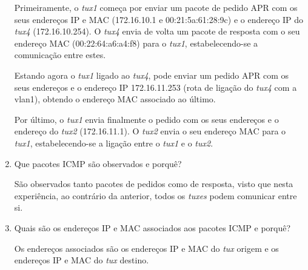 \documentclass{article}
\begin{document}
\begin{enumerate}
Primeiramente, o \textit{tux1} começa por enviar um pacote de pedido APR com os seus endereços IP e MAC (172.16.10.1 e 00:21:5a:61:28:9c) e o endereço IP do \textit{tux4} (172.16.10.254). O \textit{tux4} envia de volta um pacote de resposta com o seu endereço MAC (00:22:64:a6:a4:f8) para o \textit{tux1}, estabelecendo-se a comunicação entre estes.

Estando agora o \textit{tux1} ligado ao \textit{tux4}, pode enviar um pedido APR com os seus endereços e o endereço IP  172.16.11.253 (rota de ligação do \textit{tux4} com a vlan1), obtendo o endereço MAC associado ao último.

Por último, o \textit{tux1} envia finalmente o pedido com os seus endereços e o endereço do \textit{tux2} (172.16.11.1). O \textit{tux2} envia o seu endereço MAC para o \textit{tux1}, estabelecendo-se a ligação entre o \textit{tux1} e o \textit{tux2}.


\item Que pacotes ICMP são observados e porquê?

São observados tanto pacotes de pedidos como de resposta, visto que nesta experiência, ao contrário da anterior, todos os \textit{tuxes} podem comunicar entre si.

\item Quais são os endereços IP e MAC associados aos pacotes ICMP e porquê?

Os endereços associados são os endereços IP e MAC do \textit{tux} origem e os endereços IP e MAC do \textit{tux} destino.
\end{enumerate}
\end{document}
